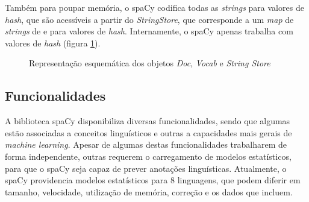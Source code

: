 \documentclass[12pt]{article}
\begin{document}
Também para poupar memória, o spaCy codifica todas as \textit{strings} para valores de \textit{hash}, que são acessíveis a partir do \textit{StringStore}, que corresponde a um \textit{map} de \textit{strings} de e para valores de \textit{hash}. Internamente, o spaCy apenas trabalha com valores de \textit{hash} (figura \ref{figure:doc-vocab-stringstore}).

\begin{figure}[!ht]
	\centering
	\setlength{\abovecaptionskip}{-.5cm}
	\caption{Representação esquemática dos objetos \textit{Doc}, \textit{Vocab} e \textit{String Store}}
	\label{figure:doc-vocab-stringstore}
\end{figure}


\subsection{Funcionalidades}

A biblioteca spaCy disponibiliza diversas funcionalidades, sendo que algumas estão associadas a conceitos linguísticos e outras a capacidades mais gerais de \textit{machine learning}. Apesar de algumas destas funcionalidades trabalharem de forma independente, outras requerem o carregamento de modelos estatísticos, para que o spaCy seja capaz de prever anotações linguísticas. Atualmente, o spaCy providencia modelos estatísticos para 8 linguagens, que podem diferir em tamanho, velocidade, utilização de memória, correção e os dados que incluem.
\end{document}
